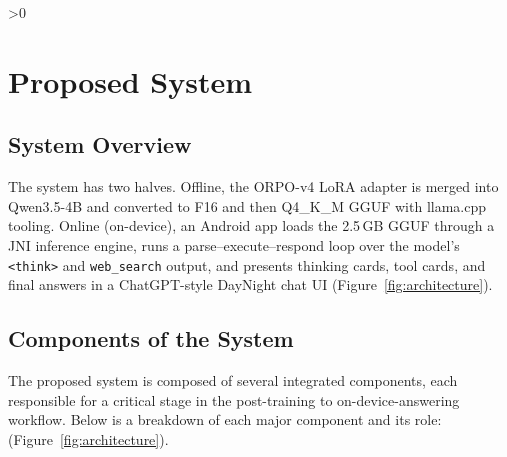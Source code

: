 \documentclass[12pt,a4paper]{report}
\let\oldchapter\chapter
\renewcommand{\chapter}{\ifnum\value{chapter}>0 \clearpage\pagestyle{fancy}\fi\oldchapter}
\begin{document}
\chapter{Proposed System}
\section{System Overview}
The system has two halves. Offline, the ORPO-v4 LoRA adapter is merged
into Qwen3.5-4B and converted to F16 and then Q4\_K\_M GGUF with
llama.cpp tooling. Online (on-device), an Android app loads the 2.5\,GB
GGUF through a JNI inference engine, runs a parse--execute--respond
loop over the model's \texttt{<think>} and \texttt{web\_search} output,
and presents thinking cards, tool cards, and final answers in a
ChatGPT-style DayNight chat UI (Figure~\ref{fig:architecture}).
\section{Components of the System}
The proposed system is composed of several integrated components, each responsible for a critical stage in the post-training to on-device-answering workflow. Below is a breakdown of each major component and its role:(Figure~\ref{fig:architecture}).
\end{document}
